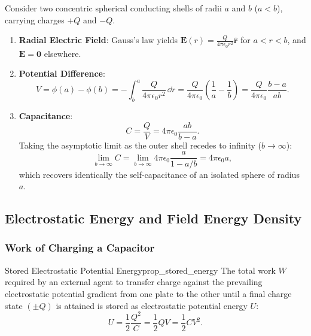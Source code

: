 \begin{example}
Consider two concentric spherical conducting shells of radii \(a\) and \(b\) (\(a < b\)), carrying charges \(+Q\) and \(-Q\).
\begin{enumerate}
    \item \textbf{Radial Electric Field}: Gauss's law yields \(\bm{E}(r) = \frac{Q}{4\pi\epsilon_0 r^2}\hat{\bm{r}}\) for \(a < r < b\), and \(\bm{E} = \bm{0}\) elsewhere.
    \item \textbf{Potential Difference}:
    \begin{equation}
        V = \phi(a) - \phi(b) = -\int_b^a \frac{Q}{4\pi\epsilon_0 r^2}\,\dd{r} = \frac{Q}{4\pi\epsilon_0}\left(\frac{1}{a} - \frac{1}{b}\right) = \frac{Q}{4\pi\epsilon_0}\frac{b - a}{a b}.
    \end{equation}
    \item \textbf{Capacitance}:
    \begin{equation}
        C = \frac{Q}{V} = 4\pi\epsilon_0 \frac{ab}{b - a}.
    \end{equation}
    Taking the asymptotic limit as the outer shell recedes to infinity (\(b \to \infty\)):
    \begin{equation}
        \lim_{b \to \infty} C = \lim_{b \to \infty} 4\pi\epsilon_0 \frac{a}{1 - a/b} = 4\pi\epsilon_0 a,
    \end{equation}
    which recovers identically the self-capacitance of an isolated sphere of radius \(a\).
\end{enumerate}
\end{example}

\subsection{Electrostatic Energy and Field Energy Density}

\subsubsection{Work of Charging a Capacitor}

\begin{proposition}{Stored Electrostatic Potential Energy}{prop_stored_energy}
The total work \(W\) required by an external agent to transfer charge against the prevailing electrostatic potential gradient from one plate to the other until a final charge state \((\pm Q)\) is attained is stored as electrostatic potential energy \(U\):
\begin{equation}
    U = \frac{1}{2}\frac{Q^2}{C} = \frac{1}{2}QV = \frac{1}{2}CV^2.
\end{equation}
\end{proposition}

